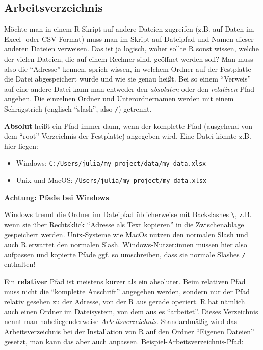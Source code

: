 \documentclass[
]{book}
\begin{document}
\hypertarget{arbeitsverzeichnis}{%
\subsection{Arbeitsverzeichnis}\label{arbeitsverzeichnis}}

Möchte man in einem R-Skript auf andere Dateien zugreifen (z.B. auf Daten im Excel- oder CSV-Format) muss man im Skript auf Dateipfad und Namen dieser anderen Dateien verweisen. Das ist ja logisch, woher sollte R sonst wissen, welche der vielen Dateien, die auf einem Rechner sind, geöffnet werden soll? Man muss also die ``Adresse'' kennen, sprich wissen, in welchem Ordner auf der Festplatte die Datei abgespeichert wurde und wie sie genau heißt. Bei so einem ``Verweis'' auf eine andere Datei kann man entweder den \emph{absoluten} oder den \emph{relativen} Pfad angeben. Die einzelnen Ordner und Unterordnernamen werden mit einem Schrägstrich (englisch ``slash'', also \texttt{/}) getrennt.

\textbf{Absolut} heißt ein Pfad immer dann, wenn der komplette Pfad (ausgehend von dem ``root''-Verzeichnis der Festplatte) angegeben wird. Eine Datei könnte z.B. hier liegen:

\begin{itemize}
\item
  Windows: \texttt{C:/Users/julia/my\_project/data/my\_data.xlsx}
\item
  Unix und MacOS: \texttt{/Users/julia/my\_project/my\_data.xlsx}
\end{itemize}

\leavevmode\hypertarget{info_windows_path}{}%
\textbf{Achtung: Pfade bei Windows}

Windows trennt die Ordner im Dateipfad üblicherweise mit Backslashes \texttt{\textbackslash{}}, z.B. wenn sie über Rechtsklick ``Adresse als Text kopieren'' in die Zwischenablage gespeichert werden. Unix-Systeme wie MacOs nutzen den normalen Slash und auch R erwartet den normalen Slash. Windows-Nutzer:innen müssen hier also aufpassen und kopierte Pfade ggf. so umschreiben, dass sie normale Slashes \texttt{/} enthalten!

Ein \textbf{relativer} Pfad ist meistens kürzer als ein absoluter. Beim relativen Pfad muss nicht die ``komplette Anschrift'' angegeben werden, sondern nur der Pfad relativ gesehen zu der Adresse, von der R aus gerade operiert. R hat nämlich auch einen Ordner im Dateisystem, von dem aus es ``arbeitet''. Dieses Verzeichnis nennt man naheliegenderweise \emph{Arbeitsverzeichnis}. Standardmäßig wird das Arbeitsverzeichnis bei der Installation von R auf den Ordner ``Eigenen Dateien'' gesetzt, man kann das aber auch anpassen. Beispiel-Arbeitsverzeichnis-Pfad:
\end{document}
